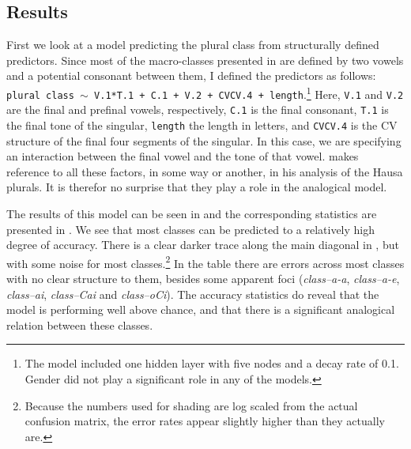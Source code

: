 \subsection{Results}

First we look at a model predicting the plural class from structurally defined predictors. Since most of the macro-classes presented in  are defined by two vowels and a potential consonant between them, I defined the predictors as follows: \texttt{plural class $\sim$ V.1*T.1 + C.1 + V.2 + CVCV.4 + length}.\footnote{The model included one hidden layer with five nodes and a decay rate of 0.1. Gender did not play a significant role in any of the models.} Here, \texttt{V.1} and \texttt{V.2} are the final and prefinal vowels, respectively, \texttt{C.1} is the final consonant, \texttt{T.1} is the final tone of the singular, \texttt{length} the length in letters, and \texttt{CVCV.4} is the CV structure of the final four segments of the singular. In this case, we are specifying an interaction between the final vowel and the tone of that vowel. \textcite[chapter 56]{Newman.2000} makes reference to all these factors, in some way or another, in his analysis of the Hausa plurals. It is therefor no surprise that they play a role in the analogical model.

The results of this model can be seen in  and the corresponding statistics are presented in . We see that most classes can be predicted to a relatively high degree of accuracy. There is a clear darker trace along the main diagonal in , but with some noise for most classes.\footnote{Because the numbers used for shading are log scaled from the actual confusion matrix, the error rates appear slightly higher than they actually are.} In the table there are errors across most classes with no clear structure to them, besides some apparent foci (\textit{class--a-a}, \textit{class--a-e}, \textit{class--ai}, \textit{class--Cai} and \textit{class--oCi}). The accuracy statistics do reveal that the model is performing well above chance, and that there is a significant analogical relation between these classes.


